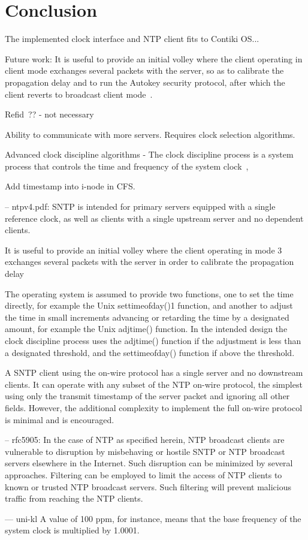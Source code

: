 



\chapter{Conclusion}
The implemented clock interface and NTP client fits to Contiki OS...

Future work:
It is useful to provide an initial volley where the client operating in
client mode exchanges several packets with the server, so as to
calibrate the propagation delay and to run the Autokey security
protocol, after which the client reverts to broadcast client mode~\cite{rfc5905}.

Refid~\cite{rfc5905}?? - not necessary

Ability to communicate with more servers. Requires clock selection algorithms.

Advanced clock discipline algorithms -
The clock discipline process is a system process that controls the
time and frequency of the system clock~\cite{rfc5905},

Add timestamp into i-node in CFS.

--
ntpv4.pdf:
SNTP is intended for primary
servers equipped with a single reference clock, as well as clients with a single upstream server
and no dependent clients.

It is useful to provide an
initial volley where the client operating in mode 3 exchanges several packets with the server in
order to calibrate the propagation delay %

The operating system is assumed to provide two functions, one to set the time
directly, for example the Unix settimeofday()1 function, and another to adjust the time in small
increments advancing or retarding the time by a designated amount, for example the Unix
adjtime() function. In the intended design the clock discipline process uses the adjtime() function
if the adjustment is less than a designated threshold, and the settimeofday() function if above the
threshold.

A SNTP client using the on-wire protocol has a single server and no downstream clients. It can
operate with any subset of the NTP on-wire protocol, the simplest using only the transmit
timestamp of the server packet and ignoring all other fields. However, the additional complexity
to implement the full on-wire protocol is minimal and is encouraged.


--
rfc5905:
In the case of NTP as specified herein, NTP broadcast clients are
vulnerable to disruption by misbehaving or hostile SNTP or NTP
broadcast servers elsewhere in the Internet.  Such disruption can be
minimized by several approaches.  Filtering can be employed to limit
the access of NTP clients to known or trusted NTP broadcast servers.
Such filtering will prevent malicious traffic from reaching the NTP
clients.

--- uni-kl
A value of 100 ppm, for instance, means that the base frequency of the system clock is multiplied by 1.0001.

